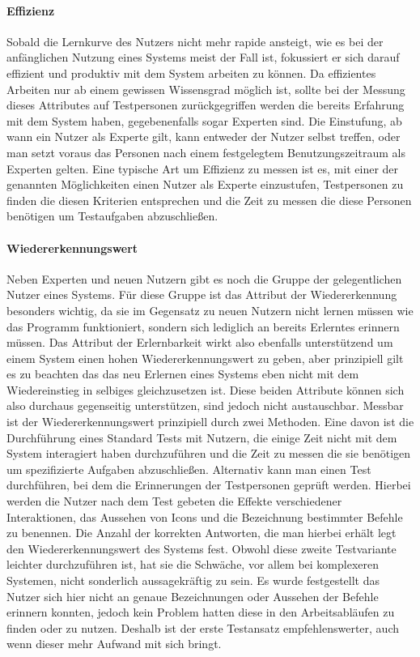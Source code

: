 \paragraph{Effizienz}
Sobald die Lernkurve des Nutzers nicht mehr rapide ansteigt, wie es bei der anfänglichen Nutzung eines Systems meist der Fall ist, fokussiert er sich darauf effizient  und produktiv mit dem System arbeiten zu können.
Da effizientes Arbeiten nur ab einem gewissen Wissensgrad möglich ist, sollte bei der Messung dieses Attributes auf Testpersonen zurückgegriffen werden die bereits Erfahrung mit dem System haben, gegebenenfalls sogar Experten sind.
Die Einstufung, ab wann ein Nutzer als Experte gilt, kann entweder der Nutzer selbst treffen, oder man setzt voraus das Personen nach einem festgelegtem Benutzungszeitraum als Experten gelten.
Eine typische Art um Effizienz zu messen ist es, mit einer der genannten Möglichkeiten einen Nutzer als Experte einzustufen, Testpersonen zu finden die diesen Kriterien entsprechen und die Zeit zu messen die diese Personen benötigen um Testaufgaben abzuschließen\cite{Nielsen.1995?}.

\paragraph{Wiedererkennungswert}
Neben Experten und neuen Nutzern gibt es noch die Gruppe der gelegentlichen Nutzer eines Systems.
Für diese Gruppe ist das Attribut der Wiedererkennung besonders wichtig, da sie im Gegensatz zu neuen Nutzern nicht lernen müssen wie das Programm funktioniert, sondern sich lediglich an bereits Erlerntes erinnern müssen.
Das Attribut der Erlernbarkeit wirkt also ebenfalls unterstützend um einem System einen hohen Wiedererkennungswert zu geben, aber prinzipiell gilt es zu beachten das das neu Erlernen eines Systems eben nicht mit dem Wiedereinstieg in selbiges gleichzusetzen ist.
Diese beiden Attribute können sich also durchaus gegenseitig unterstützen, sind jedoch nicht austauschbar.
Messbar ist der Wiedererkennungswert prinzipiell durch zwei Methoden.
Eine davon ist die Durchführung eines Standard Tests mit Nutzern, die einige Zeit nicht mit dem System interagiert haben durchzuführen und die Zeit zu messen die sie benötigen um spezifizierte Aufgaben abzuschließen.
Alternativ kann man einen Test durchführen, bei dem die Erinnerungen der Testpersonen geprüft werden.
Hierbei werden die Nutzer nach dem Test gebeten die Effekte verschiedener Interaktionen, das Aussehen von Icons und die Bezeichnung bestimmter Befehle zu benennen.
Die Anzahl der korrekten Antworten, die man hierbei erhält legt den Wiedererkennungswert des Systems fest.
Obwohl diese zweite Testvariante leichter durchzuführen ist, hat sie die Schwäche, vor allem bei komplexeren Systemen, nicht sonderlich aussagekräftig zu sein.
Es wurde festgestellt das Nutzer sich hier nicht an genaue Bezeichnungen oder Aussehen der Befehle erinnern konnten, jedoch kein Problem hatten diese in den Arbeitsabläufen zu finden oder zu nutzen.
Deshalb ist der erste Testansatz empfehlenswerter, auch wenn dieser mehr Aufwand mit sich bringt\cite{Nielsen.1995?}.

